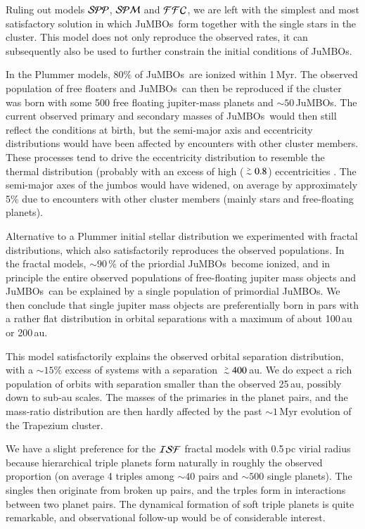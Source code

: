 \documentclass[aa]{lib/aa}
\def\apgt{\ {\raise-.5ex\hbox{$\buildrel>\over\sim$}}\ }
\newcommand{\jumbos}{\mbox{JuMBOs}}
\begin{document}
Ruling out models ${\cal SPP}$, ${\cal SPM}$ and ${\cal FFC}$, we are
left with the simplest and most satisfactory solution in which
\jumbos\, form together with the single stars in the cluster.  This
model does not only reproduce the observed rates, it can subsequently
also be used to further constrain the initial conditions of \jumbos.

In the Plummer models, 80\% of \jumbos\, are ionized within 1\,Myr.
The observed population of free floaters and \jumbos\, can then be
reproduced if the cluster was born with some 500 free floating
jupiter-mass planets and $\sim 50$\,\jumbos. The current observed
primary and secondary masses of \jumbos\, would then still reflect the
conditions at birth, but the semi-major axis and eccentricity
distributions would have been affected by encounters with other
cluster members. These processes tend to drive the eccentricity
distribution to resemble the thermal distribution (probably with an
excess of high ($\apgt 0.8$) eccentricities \cite{SPZMcM2000}. The
semi-major axes of the jumbos would have widened, on average by
approximately 5\% due to encounters with other cluster members
(mainly stars and free-floating planets).

Alternative to a Plummer initial stellar distribution we experimented
with fractal distributions, which also satisfactorily reproduces the
observed populations. In the fractal models, $\sim 90$\,\% of the
priordial \jumbos\, become ionized, and in principle the entire
observed populations of free-floating jupiter mass objects and
\jumbos\, can be explained by a single population of primordial
\jumbos. We then conclude that single jupiter mass objects are
preferentially born in pars with a rather flat distribution in orbital
separations with a maximum of about 100\,au or 200\,au.

This model satisfactorily explains the observed orbital separation
distribution, with a $\sim 15$\% excess of systems with a separation
$\apgt 400$\,au. We do expect a rich population of orbits with
separation smaller than the observed 25\,au, possibly down to sub-au
scales.  The masses of the primaries in the planet pairs, and the
mass-ratio distribution are then hardly affected by the past $\sim
1$\,Myr evolution of the Trapezium cluster.

We have a slight preference for the ${\cal ISF}$ fractal models with
0.5\,pc virial radius because hierarchical triple planets form
naturally in roughly the observed proportion (on average 4 triples
among $\sim 40$ pairs and $\sim 500$ single planets). The singles then
originate from broken up pairs, and the trples form in interactions
between two planet pairs. The dynamical formation of soft triple
planets is quite remarkable, and observational follow-up would be of
considerable interest.
\end{document}
